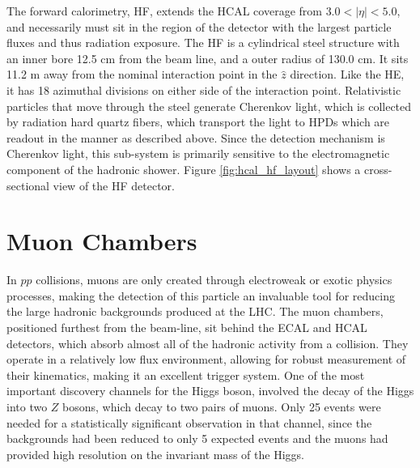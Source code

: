 \par The forward calorimetry, HF, extends the HCAL coverage from
$3.0<|\eta|<5.0$, and necessarily must sit in the region of the
detector with the largest particle fluxes and thus radiation
exposure.  The HF is a cylindrical steel structure with an inner bore
12.5 cm from the beam line, and a outer radius of 130.0 cm.  It sits
11.2 m  away from the nominal interaction point in the $\hat{z}$
direction.  Like the HE, it has 18 azimuthal divisions on either side
of the interaction point.  Relativistic particles that move through
the steel generate Cherenkov light, which is collected by radiation
hard quartz fibers, which transport the light to HPDs which are
readout in the manner as described above.  Since the detection
mechanism is Cherenkov light, this sub-system is primarily sensitive to
the electromagnetic component of the hadronic shower.  Figure
\ref{fig:hcal_hf_layout} shows a cross-sectional view of the HF
detector.   

%
%
%
%

\section{Muon Chambers}
\label{muon_chamber_description}

\par In $pp$ collisions, muons are only created through electroweak or
exotic physics processes, making the detection of this particle an
invaluable tool for reducing the large hadronic backgrounds produced
at the LHC.  The muon chambers, positioned furthest from the beam-line,
sit behind the ECAL and HCAL detectors, which absorb almost all of the
hadronic activity from a collision.  They operate in a relatively low
flux environment, allowing for robust measurement of their
kinematics, making it an excellent trigger system.  One of the most
important discovery channels for the  Higgs boson, involved the decay of
the Higgs into two $Z$ bosons, which decay to two pairs of muons.
Only 25 events were needed for a statistically significant observation
in that channel, since the backgrounds had been reduced to only 5
expected events and the muons had provided high resolution on the
invariant mass of the Higgs.   

